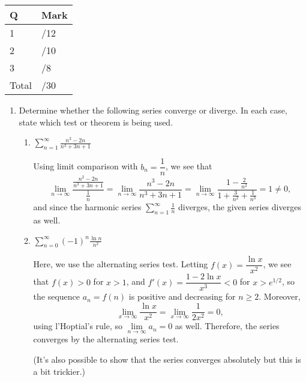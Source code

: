 \documentclass[12pt]{article}
\newcommand{\di}{\displaystyle}
\begin{document}
\begin{table}[hbt]
\begin{center}
\begin{tabular}{|l|l|} \hline
Q&Mark\\
\hline \hline
\cline{1-2} 1 & \enspace\enspace\enspace\enspace\enspace\enspace/12\\
\cline{1-2} 2 & \enspace\enspace\enspace\enspace\enspace\enspace/10\\
\cline{1-2} 3 & \enspace\enspace\enspace\enspace\enspace\enspace/8\\
\cline{1-2} Total & \enspace\enspace\enspace\enspace\enspace\enspace/30\\
\hline
\end{tabular}
\end{center}
\end{table}
\newpage
\begin{enumerate}
\item Determine whether the following series converge or diverge.  In each case, state which test or theorem is being used.
\begin{enumerate}
\item $\di \sum_{n=1}^\infty \frac{n^2-2n}{n^3+3n+1}$\marginpar{[4]}

\bigskip

Using limit comparison with $b_n=\dfrac{1}{n}$, we see that
\[
\lim_{n\to\infty}\frac{\frac{n^2-2n}{n^3+3n+1}}{\frac{1}{n}} = \lim_{n\to\infty}\frac{n^3-2n}{n^3+3n+1}=\lim _{n\to\infty}\frac{1-\frac{2}{n^2}}{1+\frac{3}{n^2}+\frac{1}{n^3}}=1\neq 0,
\]
and since the harmonic series $\di \sum_{n=1}^\infty \frac{1}{n}$ diverges, the given series diverges as well.

\vspace{1in}


\item $\di \sum_{n=0}^\infty (-1)^n\frac{\ln n}{n^2}$\marginpar{[4]}

\bigskip

Here, we use the alternating series test.  Letting $f(x)=\dfrac{\ln x}{x^2}$, we see that $f(x)>0$ for $x>1$, and $f'(x)=\dfrac{1-2\ln x}{x^3}<0$ for $x>e^{1/2}$, so the sequence $a_n=f(n)$ is positive and decreasing for $n\geq 2$.
Moreover,
\[
\lim_{x\to\infty}\frac{\ln x}{x^2} = \lim_{x\to\infty}\frac{1}{2x^2}=0,
\]
using l'Hoptial's rule, so $\lim\limits_{n\to\infty}a_n = 0$ as well.  Therefore, the series converges by the alternating series test.

(It's also possible to show that the series converges absolutely but this is a bit trickier.)
\vspace{1in}




\end{enumerate}
\end{enumerate}
\end{document}
